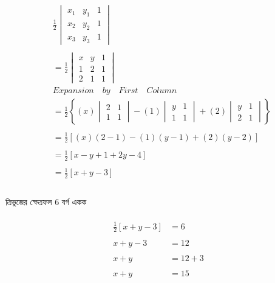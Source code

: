 \documentclass{article}
\begin{document}
\begin{align*}
	&\frac{1}{2}\begin{vmatrix}
		x_1 &	y_1 & 1\\
		x_2 & y_2 & 1\\
		x_3 & y_3 & 1
	\end{vmatrix}\\
	\\
	&=\frac{1}{2}\begin{vmatrix}
		x & y & 1\\
		1 & 2 & 1\\
		2 & 1 & 1
	\end{vmatrix}\\
	&\boxed{Expansion \quad by \quad  First \quad  Column}\\ 
	&=\frac{1}{2}\left\{(x)\begin{vmatrix}
		2 & 1\\
		1 & 1
	\end{vmatrix}-(1)\begin{vmatrix}
		y & 1\\
		1 & 1
	\end{vmatrix}+(2)\begin{vmatrix}
		y & 1\\
		2 & 1
	\end{vmatrix}\right\}\\
	\\
	&=\frac{1}{2}\left[(x)(2-1)-(1)(y-1)+(2)(y-2)\right]\\
	\\
	&=\frac{1}{2}\left[x-y+1+2y-4\right]\\
	\\
	&=\frac{1}{2}\left[x+y-3\right]\\
\end{align*}
\\
ত্রিভুজের ক্ষেত্রফল $6$ বর্গ একক \\
\\ 
\begin{align*}
\frac{1}{2}\left[x+y-3\right]&=6\\
\\
x+y-3&=12\\
\\
x+y&=12+3\\
\\
x+y&=15
\end{align*}
\end{document}
